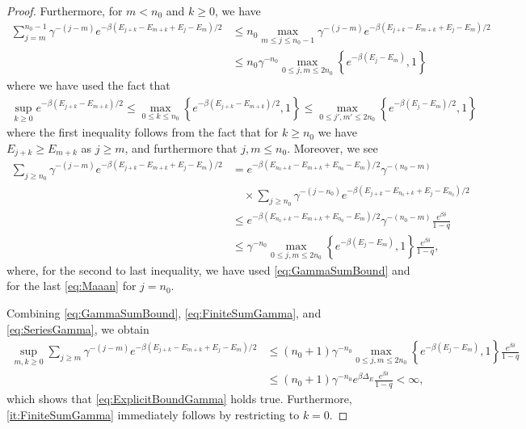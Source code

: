 \documentclass[11pt]{amsart}
\newcommand{\nn}{\nonumber}
\newcommand{\1}{\mathbbm{1}}
\theoremstyle{plain}
\theoremstyle{definition}
\theoremstyle{remark}
\numberwithin{equation}{section}
\begin{document}
\begin{proof}
Furthermore, for $m<n_0$ and $k\ge0$, we have
\begin{align}
\label{eq:FiniteSumGamma}
    \sum_{j=m}^{n_0-1} \gamma^{-(j-m)}e^{-\beta(E_{j+k}-E_{m+k}+E_j-E_m)/2} &\le n_0\max_{m\le j\le n_0-1}\gamma^{-(j-m)}e^{-\beta(E_{j+k}-E_{m+k}+E_j-E_m)/2} \\
    \nn&
   \le n_0\gamma^{-n_0}\max_{0\le j,m\le 2n_0}\left\{e^{-\beta(E_{j}-E_{m})},1\right\} 
\end{align}
where we have used the fact that 
\begin{equation}
\begin{split}
\label{eq:Maaan}
\sup_{k\ge 0}e^{-\beta(E_{j +k}-E_{m+k})/2} \le \max_{0\le k\le n_0}\left\{e^{-\beta(E_{j +k}-E_{m+k})/2},1\right\} \le \max_{0\le j',m'\le 2n_0}\left\{e^{-\beta(E_{j}-E_{m})/2},1\right\}
\end{split}
\end{equation}
where the first inequality follows from the fact that for $k\ge n_0$ we have $E_{j+k}\ge E_{m+k}$ as $j\ge m$, and furthermore that $j,m\le n_0.$
Moreover, we see 
\begin{align}
\label{eq:SeriesGamma}
    \sum_{j\ge n_0} \gamma^{-(j-m)}   e^{-\beta(E_{j+k}-E_{m+k}+E_j-E_m)/2}  &
      = e^{-\beta(E_{n_0+k}-E_{m+k}+E_{n_0}-E_m)/2}\gamma^{-(n_0-m)}\nn
      \\
      &\quad\nn\times\sum_{j\ge n_0}   \gamma^{-(j-n_0)}e^{-\beta(E_{j+k}-E_{n_0+k}+E_j-E_{n_0})/2} \\
      &\le \nn e^{-\beta(E_{n_0+k}-E_{m+k}+E_{n_0}-E_m)/2}\gamma^{-(n_0-m)}\frac{e^{\beta\delta}}{1-q}\\&\le \gamma^{-n_0}\max_{0\le j,m\le 2n_0}\left\{e^{-\beta(E_{j}-E_{m})},1\right\}\frac{e^{\beta\delta}}{1-q},
\end{align}
where, for the second to last inequality, we have used \eqref{eq:GammaSumBound} and for the last \eqref{eq:Maaan} for $j=n_0.$

Combining \eqref{eq:GammaSumBound}, \eqref{eq:FiniteSumGamma}, and \eqref{eq:SeriesGamma}, we obtain
\begin{align*}
     \sup_{m,k\ge 0}\sum_{j\ge m} \gamma^{-(j-m)}e^{-\beta(E_{j+k} - E_{m+k}+E_{j} - E_m)/2} &\le 
(n_0+1)\gamma^{-n_0} \max_{0\le j,m\le 2n_0}\left\{ e^{-\beta(E_j-E_m)} ,1\right\}\frac{e^{\beta\delta}}{1-q}  
\\&\le (n_0+1)\gamma^{-n_0}  e^{\beta\Delta_E} \frac{e^{\beta\delta}}{1-q}
<\infty,  
\end{align*}
which shows that \eqref{eq:ExplicitBoundGamma} 
holds true. Furthermore, \eqref{it:FiniteSumGamma} immediately follows by restricting to $k=0.$



\end{proof}
\end{document}
